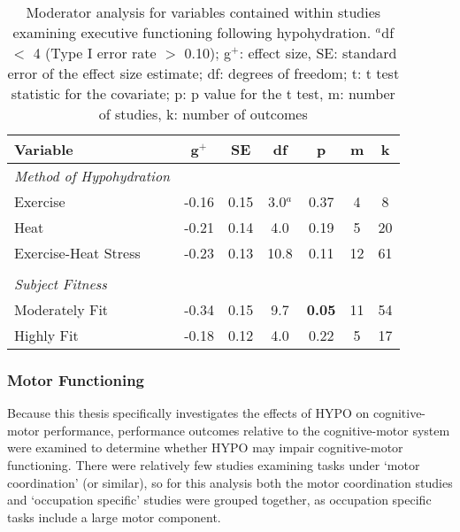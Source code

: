 \begin{table}
	\caption{Moderator analysis for variables contained within studies examining executive functioning following hypohydration. ${^a}$df ${<}$ 4 (Type I error rate ${>}$ 0.10); g${^+}$: effect size, SE: standard error of the effect size estimate; df: degrees of freedom; t: t test statistic for the covariate; p: p value for the t test, m: number of studies, k: number of outcomes}
	\centering
	\begin{tabular}{lcccccc} 
		\hline
		\textbf{Variable} & \textbf{g${^+}$} & \textbf{SE} & \textbf{df} & \textbf{p} & \textbf{m} & 
		\textbf{k} \\
		\hline
		\textit{Method of Hypohydration} &&&&&& \\
		Exercise & -0.16 & 0.15 & 3.0${^a}$ & 0.37 & 4 & 8 \\
		Heat & -0.21 & 0.14 & 4.0 & 0.19 & 5 & 20 \\ 
		Exercise-Heat Stress & -0.23 & 0.13 & 10.8 & 0.11 & 12 & 61 \\
		&&&&&& \\
		\textit{Subject Fitness} &&&&&& \\
		Moderately Fit & -0.34 & 0.15 & 9.7 & \textbf{0.05} & 11 & 54 \\
		Highly Fit & -0.18 & 0.12 & 4.0 & 0.22 & 5 & 17 \\
		\hline		    
	\end{tabular}
	\label{tbl:ex_func_moderators}
\end{table}


\subsubsection{Motor Functioning}
Because this thesis specifically investigates the effects of HYPO on cognitive-motor performance, performance outcomes relative to the cognitive-motor system were examined to determine whether HYPO may impair cognitive-motor functioning. There were relatively few studies examining tasks under `motor coordination' (or similar), so for this analysis both the motor coordination studies and `occupation specific' studies were grouped together, as occupation specific tasks include a large motor component.

